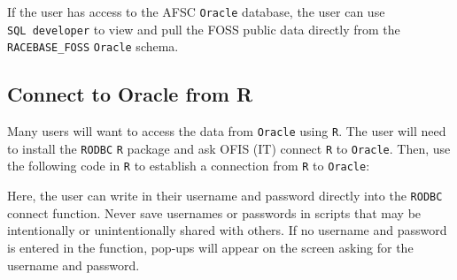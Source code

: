 \documentclass[
  letterpaper,
  oneside,
  open=any]{scrbook}
\begin{document}
If the user has access to the AFSC \texttt{Oracle} database, the user
can use \texttt{SQL\ developer} to view and pull the FOSS public data
directly from the \texttt{RACEBASE\_FOSS} \texttt{Oracle} schema.

\hypertarget{connect-to-oracle-from-r-1}{%
\subsection{Connect to Oracle from R}\label{connect-to-oracle-from-r-1}}

Many users will want to access the data from \texttt{Oracle} using
\texttt{R}. The user will need to install the \texttt{RODBC} \texttt{R}
package and ask OFIS (IT) connect \texttt{R} to \texttt{Oracle}. Then,
use the following code in \texttt{R} to establish a connection from
\texttt{R} to \texttt{Oracle}:

Here, the user can write in their username and password directly into
the \texttt{RODBC} connect function. Never save usernames or passwords
in scripts that may be intentionally or unintentionally shared with
others. If no username and password is entered in the function, pop-ups
will appear on the screen asking for the username and password.
\end{document}
